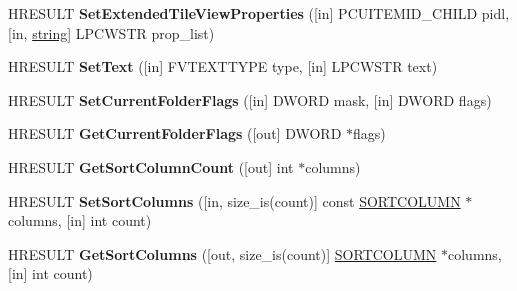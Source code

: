 \begin{DoxyCompactItemize}
\item 
\mbox{\label{interface_i_folder_view2_a006a2e7f5c3b632a96f034016f28206d}} 
H\+R\+E\+S\+U\+LT {\bfseries Set\+Extended\+Tile\+View\+Properties} (\mbox{[}in\mbox{]} P\+C\+U\+I\+T\+E\+M\+I\+D\+\_\+\+C\+H\+I\+LD pidl, \mbox{[}in, \hyperlink{structstring}{string}\mbox{]} L\+P\+C\+W\+S\+TR prop\+\_\+list)
\item 
\mbox{\label{interface_i_folder_view2_a03ad4f2605b9cb15cc48a366b227c3a9}} 
H\+R\+E\+S\+U\+LT {\bfseries Set\+Text} (\mbox{[}in\mbox{]} F\+V\+T\+E\+X\+T\+T\+Y\+PE type, \mbox{[}in\mbox{]} L\+P\+C\+W\+S\+TR text)
\item 
\mbox{\label{interface_i_folder_view2_afa937e9363a15f44660428133fdfb833}} 
H\+R\+E\+S\+U\+LT {\bfseries Set\+Current\+Folder\+Flags} (\mbox{[}in\mbox{]} D\+W\+O\+RD mask, \mbox{[}in\mbox{]} D\+W\+O\+RD flags)
\item 
\mbox{\label{interface_i_folder_view2_a5c9213ebe08d57e36aa12805e2811d9a}} 
H\+R\+E\+S\+U\+LT {\bfseries Get\+Current\+Folder\+Flags} (\mbox{[}out\mbox{]} D\+W\+O\+RD $\ast$flags)
\item 
\mbox{\label{interface_i_folder_view2_a19f325bf8cb848727ac182760e3d2fe0}} 
H\+R\+E\+S\+U\+LT {\bfseries Get\+Sort\+Column\+Count} (\mbox{[}out\mbox{]} int $\ast$columns)
\item 
\mbox{\label{interface_i_folder_view2_a59856d079a70f0af3958fef2d6f78032}} 
H\+R\+E\+S\+U\+LT {\bfseries Set\+Sort\+Columns} (\mbox{[}in, size\+\_\+is(count)\mbox{]} const \hyperlink{struct_s_o_r_t_c_o_l_u_m_n}{S\+O\+R\+T\+C\+O\+L\+U\+MN} $\ast$columns, \mbox{[}in\mbox{]} int count)
\item 
\mbox{\label{interface_i_folder_view2_aa3948c565edb9997865701f42e186164}} 
H\+R\+E\+S\+U\+LT {\bfseries Get\+Sort\+Columns} (\mbox{[}out, size\+\_\+is(count)\mbox{]} \hyperlink{struct_s_o_r_t_c_o_l_u_m_n}{S\+O\+R\+T\+C\+O\+L\+U\+MN} $\ast$columns, \mbox{[}in\mbox{]} int count)
\item 
\mbox{\label{interface_i_folder_view2_a925882535fd03b01ddb804dcd1007cd6}} 

\end{DoxyCompactItemize}
